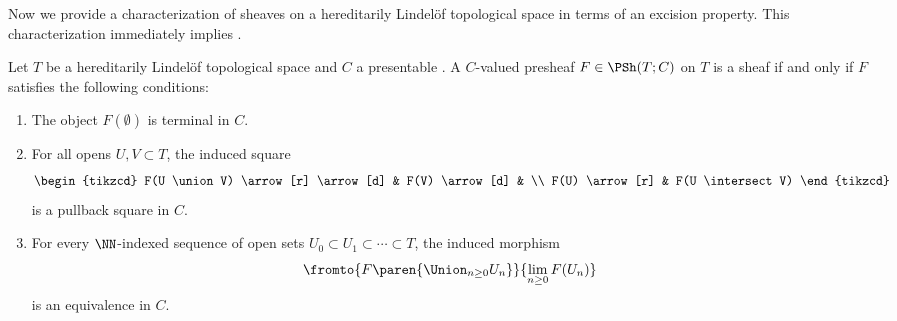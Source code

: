 Now we provide a characterization of sheaves on a hereditarily Lindelöf topological space in terms of an excision property.
This characterization immediately implies .

\begin{proposition}\label{prop:Lindelofexcision}
	Let $ T $ be a hereditarily Lindelöf topological space and $ C $ a presentable \category.
	A $ C $-valued presheaf $ F \in \PSh(T;C) $ on $ T $ is a sheaf if and only if $ F $ satisfies the following conditions:
	\begin{enumerate}
		\item\label{prop:Lindelofexcision.1} The object $ F(\emptyset) $ is terminal in $ C $.

		\item\label{prop:Lindelofexcision.2} For all opens $ U, V \subset T $, the induced square 
		\begin{equation*}
			\begin{tikzcd}
				F(U \union V) \arrow[r] \arrow[d] & F(V) \arrow[d] & \\
				F(U) \arrow[r] & F(U \intersect V) 
			\end{tikzcd}
		\end{equation*}
		is a pullback square in $ C $.

		\item\label{prop:Lindelofexcision.3} For every $ \NN $-indexed sequence of open sets $ U_0 \subset U_1 \subset \cdots \subset T $, the induced morphism
		\begin{equation*}
			\fromto{F\paren{\textstyle\Union_{n \geq 0} U_n}}{\lim_{n \geq 0} F(U_n)}
		\end{equation*}
		is an equivalence in $ C $.
	\end{enumerate}
\end{proposition}

